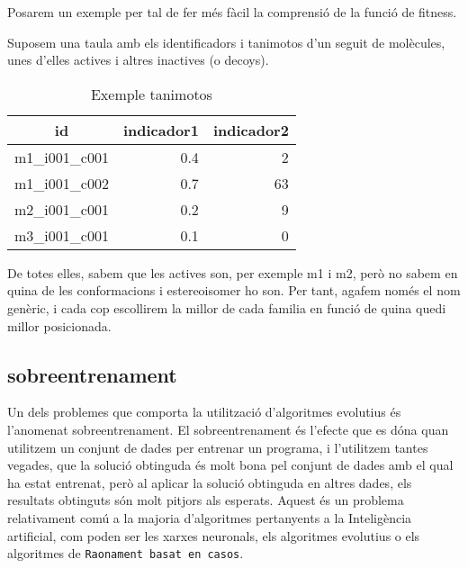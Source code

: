\documentclass[titlepage,a4paper,12pt]{book}
\begin{document}
Posarem un exemple per tal de fer més fàcil la comprensió de la funció de
fitness.

Suposem una taula amb els identificadors i tanimotos d'un seguit de molècules,
unes d'elles actives i altres inactives (o decoys).



\begin{table}
\centering
\caption{Exemple tanimotos}
\begin{tabular}{|l|r|r|}
\hline
\multicolumn{1}{|c|}{\textbf{id }} & \multicolumn{1}{c|}{\textbf{ indicador1 }} & \multicolumn{1}{c|}{\textbf{ indicador2}} \\
\hline
\hline
m1\_i001\_c001 & 0.4 & 2  \\
m1\_i001\_c002 & 0.7 & 63 \\
m2\_i001\_c001 & 0.2 & 9  \\
m3\_i001\_c001 & 0.1 & 0  \\
\hline
\end{tabular}
\end{table}

De totes elles, sabem que les actives son, per exemple m1 i m2, però no sabem
en quina de les conformacions i estereoisomer ho son.  Per tant, agafem només el
nom genèric, i cada cop escollirem la millor de cada familia en funció de quina
quedi millor posicionada.



\subsection{sobreentrenament} %
\label{sub:sobreentrenament}

Un dels problemes que comporta la utilització d'algoritmes evolutius és
l'anomenat sobreentrenament.  El sobreentrenament és l'efecte que es dóna quan
utilitzem un conjunt de dades per entrenar un programa, i l'utilitzem tantes
vegades, que la solució obtinguda és molt bona pel conjunt de dades amb el qual
ha estat entrenat, però al aplicar la solució obtinguda en altres dades, els
resultats obtinguts són molt pitjors als esperats.  Aquest és un problema
relativament comú a la majoria d'algoritmes pertanyents a la Inteligència
artificial, com poden ser les xarxes neuronals, els algoritmes evolutius o els
algoritmes de \texttt{Raonament basat en casos}.
\end{document}

